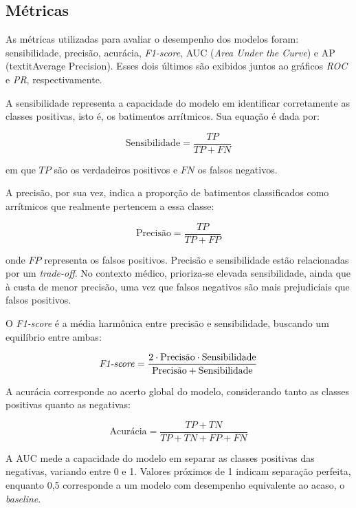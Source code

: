 \subsection{Métricas}
\label{sec:metricas}

As métricas utilizadas para avaliar o desempenho dos modelos foram: sensibilidade, precisão, acurácia, \textit{F1-score}, AUC (\textit{Area Under the Curve}) e AP (textit{Average Precision}). Esses 
dois últimos são exibidos juntos ao gráficos \textit{ROC} e \textit{PR}, respectivamente.

A sensibilidade representa a capacidade do modelo em identificar corretamente as classes positivas, isto é, os batimentos arrítmicos. Sua equação é dada por:

\begin{equation}
\text{Sensibilidade} = \frac{TP}{TP + FN}
\end{equation}

em que $TP$ são os verdadeiros positivos e $FN$ os falsos negativos.  

A precisão, por sua vez, indica a proporção de batimentos classificados como arrítmicos que realmente pertencem a essa classe:

\begin{equation}
\text{Precisão} = \frac{TP}{TP + FP}
\end{equation}

onde $FP$ representa os falsos positivos. Precisão e sensibilidade estão relacionadas por um \textit{trade-off}. No contexto médico, prioriza-se elevada sensibilidade, ainda que à custa de menor precisão, uma vez que falsos negativos são mais prejudiciais que falsos positivos.  

O \textit{F1-score} é a média harmônica entre precisão e sensibilidade, buscando um equilíbrio entre ambas:

\begin{equation}
\text{\textit{F1-score}} = \frac{2 \cdot \text{Precisão} \cdot \text{Sensibilidade}}{\text{Precisão} + \text{Sensibilidade}}
\end{equation}

A acurácia corresponde ao acerto global do modelo, considerando tanto as classes positivas quanto as negativas:

\begin{equation}
\text{Acurácia} = \frac{TP + TN}{TP + TN + FP + FN}
\end{equation}

A AUC mede a capacidade do modelo em separar as classes positivas das negativas, variando entre 0 e 1. Valores próximos de 1 indicam separação perfeita, enquanto 0,5 corresponde a um modelo com desempenho equivalente ao acaso,
o \textit{baseline}.

